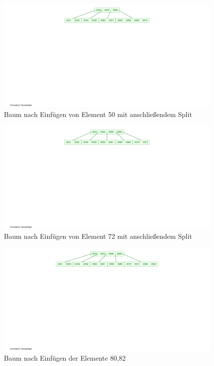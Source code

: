 \documentclass[12pt]{scrartcl}
\begin{document}
\begin{figure}[h!]
\begin{center}
\includegraphics[scale=0.5]{B-Tree6.png}
\caption{Baum nach Einfügen von Element 50 mit anschließendem Split}
\end{center}
\end{figure}

\begin{figure}[h!]
\begin{center}
\includegraphics[scale=0.5]{B-Tree7.png}
\caption{Baum nach Einfügen von Element 72 mit anschließendem Split}
\end{center}
\end{figure}

\begin{figure}[h!]
\begin{center}
\includegraphics[scale=0.5]{B-Tree8.png}
\caption{Baum nach Einfügen der Elemente 80,82}
\end{center}
\end{figure}
\end{document}
